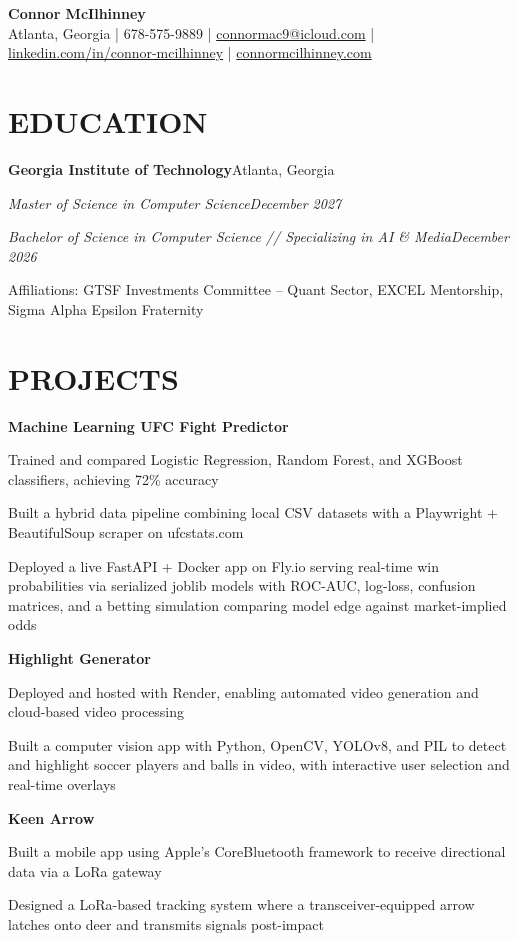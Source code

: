\documentclass[letterpaper,10pt]{article}
\newcommand{\headerrow}[2]{\textbf{#1}\hfill #2\par}
\newcommand{\subrow}[2]{\textit{#1}\hfill \textit{#2}\par}
\newcommand{\entrytitle}[1]{\textbf{#1}\par}
\newcommand{\gap}{\vspace{3pt}}
\begin{document}
\begin{center}
  {\LARGE\bfseries Connor McIlhinney}\\[3pt]
  {Atlanta, Georgia | 678-575-9889 |
  \href{mailto:connormac9@icloud.com}{connormac9@icloud.com} |
  \href{https://linkedin.com/in/connor-mcilhinney}{linkedin.com/in/connor-mcilhinney} |
  \href{https://connormcilhinney.com}{connormcilhinney.com}}
\end{center}
\vspace{-4pt}

\section{EDUCATION}
\headerrow{Georgia Institute of Technology}{Atlanta, Georgia}
\subrow{Master of Science in Computer Science}{December 2027}
\subrow{Bachelor of Science in Computer Science // Specializing in AI \& Media}{December 2026}
Affiliations: GTSF Investments Committee -- Quant Sector, EXCEL Mentorship, Sigma Alpha Epsilon Fraternity

\section{PROJECTS}
\entrytitle{Machine Learning UFC Fight Predictor}
\begin{tight}
  \item Trained and compared Logistic Regression, Random Forest, and XGBoost classifiers, achieving 72\% accuracy
  \item Built a hybrid data pipeline combining local CSV datasets with a Playwright + BeautifulSoup scraper on ufcstats.com
  \item Deployed a live FastAPI + Docker app on Fly.io serving real-time win probabilities via serialized joblib models with ROC-AUC, log-loss, confusion matrices, and a betting simulation comparing model edge against market-implied odds
\end{tight}
\gap
\entrytitle{Highlight Generator}
\begin{tight}
  \item Deployed and hosted with Render, enabling automated video generation and cloud-based video processing
  \item Built a computer vision app with Python, OpenCV, YOLOv8, and PIL to detect and highlight soccer players and balls in video, with interactive user selection and real-time overlays
\end{tight}
\gap
\entrytitle{Keen Arrow}
\begin{tight}
  \item Built a mobile app using Apple's CoreBluetooth framework to receive directional data via a LoRa gateway
  \item Designed a LoRa-based tracking system where a transceiver-equipped arrow latches onto deer and transmits signals post-impact
\end{tight}
\end{document}
